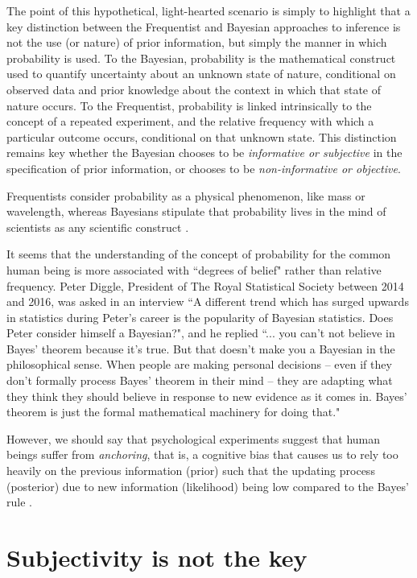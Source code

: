The point of this hypothetical, light-hearted scenario is simply to highlight that a key distinction between the Frequentist and Bayesian approaches to inference is not the use (or nature) of prior information, but simply the manner in which probability is used. To the Bayesian, probability is the mathematical construct used to quantify uncertainty about an unknown state of nature, conditional on observed data and prior knowledge about the context in which that state of nature occurs. To the Frequentist, probability is linked intrinsically to the concept of a repeated experiment, and the relative frequency with which a particular outcome occurs, conditional on that unknown state. This distinction remains key whether the Bayesian chooses to be \textit{informative or subjective} in the specification of prior information, or chooses to be \textit{non-informative or objective}.

Frequentists consider probability as a physical phenomenon, like mass or wavelength, whereas Bayesians stipulate that probability lives in the mind of scientists as any scientific construct \cite{Parmigiani2008}.

It seems that the understanding of the concept of probability for the common human being is more associated with ``degrees of belief" rather than relative frequency. Peter Diggle, President of The Royal Statistical Society between 2014 and 2016, was asked in an interview ``A different trend which has surged upwards in statistics during Peter's career is the popularity of Bayesian statistics. Does Peter consider himself a Bayesian?", and he replied ``... you can't not believe in Bayes' theorem because it's true. But that doesn't make you a Bayesian in the philosophical sense. When people are making personal decisions -- even if they don't formally process Bayes' theorem in their mind -- they are adapting what they think they should believe in response to new evidence as it comes in. Bayes' theorem is just the formal mathematical machinery for doing that."

However, we should say that psychological experiments suggest that human beings suffer from \textit{anchoring}, that is, a cognitive bias that causes us to rely too heavily on the previous information (prior) such that the updating process (posterior) due to new information (likelihood) being low compared to the Bayes' rule \cite{daniel2017thinking}.

\section{Subjectivity is not the key}\label{sec22}


